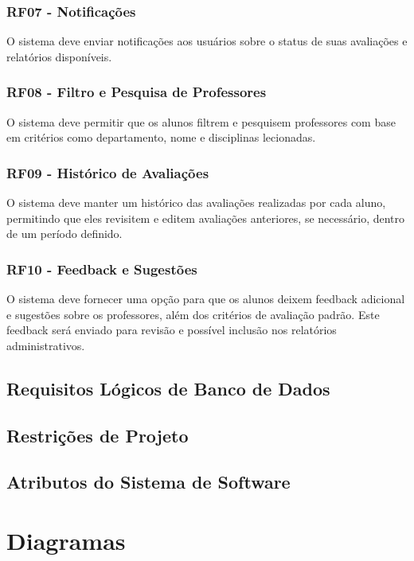\documentclass[12pt]{article}
\begin{document}
      \subsubsection{RF07 - Notificações}
          O sistema deve enviar notificações aos usuários sobre o status de suas avaliações e relatórios disponíveis.
      \subsubsection{RF08 - Filtro e Pesquisa de Professores}
          O sistema deve permitir que os alunos filtrem e pesquisem professores com base em critérios como departamento, nome e disciplinas lecionadas.
      \subsubsection{RF09 - Histórico de Avaliações}
          O sistema deve manter um histórico das avaliações realizadas por cada aluno, permitindo que eles revisitem e editem avaliações anteriores, se necessário, dentro de um período definido.
      \subsubsection{RF10 - Feedback e Sugestões}
          O sistema deve fornecer uma opção para que os alunos deixem feedback adicional e sugestões sobre os professores, além dos critérios de avaliação padrão. Este feedback será enviado para revisão e possível inclusão nos relatórios administrativos.
  
  \subsection{Requisitos Lógicos de Banco de Dados}
  \subsection{Restrições de Projeto}
  \subsection{Atributos do Sistema de Software}

  \newpage
  \section{Diagramas}
\end{document}
